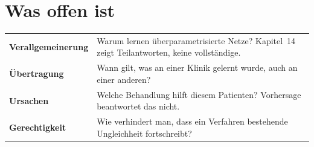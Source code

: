 \section{Was offen ist}

\begin{merksatz}
\begin{center}
{\small
\renewcommand{\arraystretch}{1.55}
\begin{tabular}{@{}P{3.2cm}P{5.4cm}@{}}
\toprule
\textbf{Verallgemei\-nerung} & Warum lernen überparametrisierte Netze? Kapitel~14 zeigt Teilantworten, keine vollständige.\\
\textbf{Übertragung} & Wann gilt, was an einer Klinik gelernt wurde, auch an einer anderen?\\
\textbf{Ursachen} & Welche Behandlung hilft diesem Patienten? Vorhersage beantwortet das nicht.\\
\textbf{Gerechtigkeit} & Wie verhindert man, dass ein Verfahren bestehende Ungleichheit fortschreibt?\\
\bottomrule
\end{tabular}}
\end{center}
\end{merksatz}

